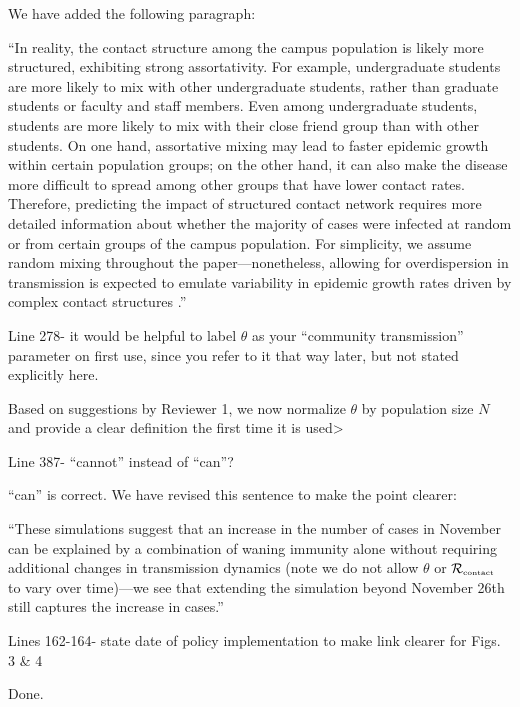\documentclass[12pt]{article}
\newcommand{\Rx}[1]{\ensuremath{{\mathcal R}_{#1}}}
\newcommand{\Rc}{\Rx{\textrm{\tiny{contact}}}}
\newcommand{\revtext}{\textsf}
\begin{document}
We have added the following paragraph:

``In reality, the contact structure among the campus population is likely more structured, exhibiting strong assortativity.
For example, undergraduate students are more likely to mix with other undergraduate students, rather than graduate students or faculty and staff members.
Even among undergraduate students, students are more likely to mix with their close friend group than with other students.
On one hand, assortative mixing may lead to faster epidemic growth within certain population groups;
on the other hand, it can also make the disease more difficult to spread among other groups that have lower contact rates.
Therefore, predicting the impact of structured contact network requires more detailed information about whether the majority of cases were infected at random or from certain groups of the campus population.
For simplicity, we assume random mixing throughout the paper---nonetheless, allowing for overdispersion in transmission is expected to emulate variability in epidemic growth rates driven by complex contact structures \citep{lloyd2005superspreading}.''

\revtext{Line 278- it would be helpful to label $\theta$ as your “community transmission” parameter on first use, since you refer to it that way later, but not stated explicitly here.}

Based on suggestions by Reviewer 1, we now normalize $\theta$ by population size $N$ and provide a clear definition the first time it is used>

\revtext{Line 387- “cannot” instead of “can”?}

``can'' is correct. We have revised this sentence to make the point clearer:

``These simulations suggest that an increase in the number of cases in November can be explained by a combination of waning immunity alone without requiring additional changes in transmission dynamics (note we do not allow $\theta$ or $\Rc$ to vary over time)---we see that extending the simulation beyond November 26th still captures the increase in cases.''

\revtext{Lines 162-164- state date of policy implementation to make link clearer for Figs. 3 \& 4} 

Done.


\end{document}
